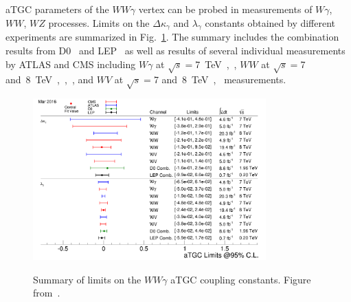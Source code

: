 

\label{sec:WgAbout_PastMeas}

aTGC parameters of the $WW\gamma$ vertex can be probed in measurements of $W\gamma$, $WW$, $WZ$ processes. Limits on the $\Delta \kappa_\gamma$ and $\lambda_\gamma$ constants obtained by different experiments are summarized in Fig.~\ref{fig:aTGC_cg}. The summary includes the combination results from D0~\cite{ref_D0_aTGC_comb} and LEP~\cite{ref_LEP_aTGC_comb} as well as results of several individual measurements by ATLAS and CMS including $W\gamma$ at $\sqrt{s}=$7~TeV~\cite{ref_7TeV_ATLAS},~\cite{ref_7TeV_CMS}, $WW$ at $\sqrt{s}=$7 and~8~TeV~\cite{ref_ATLAS_WW_8TeV},~\cite{ref_CMS_WW_7TeV},~\cite{ref_CMS_WW_8TeV}, and $WV$ at $\sqrt{s}=$7 and~8~TeV~\cite{ref_ATLAS_VW_8TeV},~\cite{ref_CMS_VW_7TeV} measurements.\\ 

\begin{figure}[htb]
  \begin{center}
    {\includegraphics[width=0.80\textwidth]{../figs/WgAbout/aTGC_cg.png}}
    \caption{Summary of limits on the $WW\gamma$ aTGC coupling constants. Figure from~\cite{ref_twiki_SMP_ATGC}.}
    \label{fig:aTGC_cg}
  \end{center}
\end{figure}

